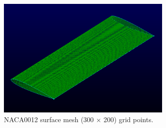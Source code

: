 \begin{figure}
    \centering
    \includegraphics[height=59mm, width=\textwidth]{figures/wing_3d.png}
    \caption{NACA0012 surface mesh (300 $\times$ 200) grid points.}
    \label{naca0012 wing mesh}
\end{figure}


